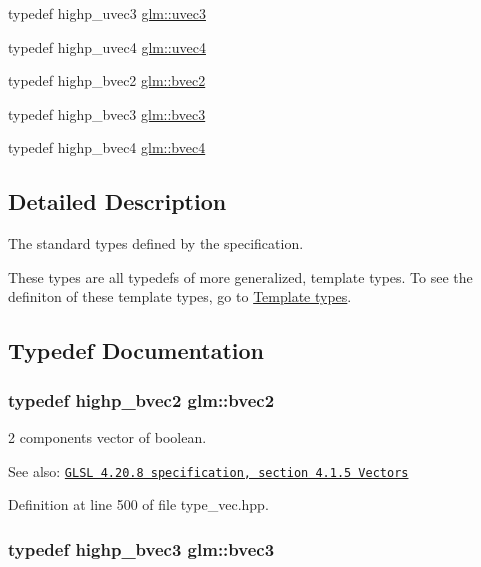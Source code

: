 \begin{CompactItemize}
\item 
typedef highp\_\-uvec3 \hyperlink{group__core__types_gc4ba593917841b859ba1683b8b52b8fa}{glm::uvec3}
\item 
typedef highp\_\-uvec4 \hyperlink{group__core__types_g1c426d19627b32b14f0089f7f4ba7b1d}{glm::uvec4}
\item 
typedef highp\_\-bvec2 \hyperlink{group__core__types_g7523cf292181cf7daef3aa0a3267d8e3}{glm::bvec2}
\item 
typedef highp\_\-bvec3 \hyperlink{group__core__types_g3f07d6d37fc6fe875170fd5799685bcf}{glm::bvec3}
\item 
typedef highp\_\-bvec4 \hyperlink{group__core__types_g6bb211b3d3bebae3867548d5673ca5cd}{glm::bvec4}
\end{CompactItemize}


\subsection{Detailed Description}
The standard types defined by the specification. 

These types are all typedefs of more generalized, template types. To see the definiton of these template types, go to \hyperlink{group__core__template}{Template types}. 

\subsection{Typedef Documentation}
\hypertarget{group__core__types_g7523cf292181cf7daef3aa0a3267d8e3}{
\subsubsection[bvec2]{\setlength{\rightskip}{0pt plus 5cm}typedef highp\_\-bvec2 {\bf glm::bvec2}}}
\label{group__core__types_g7523cf292181cf7daef3aa0a3267d8e3}


2 components vector of boolean.

\begin{Desc}
\item[See also:]\href{http://www.opengl.org/registry/doc/GLSLangSpec.4.20.8.pdf}{\tt GLSL 4.20.8 specification, section 4.1.5 Vectors} \end{Desc}


Definition at line 500 of file type\_\-vec.hpp.\hypertarget{group__core__types_g3f07d6d37fc6fe875170fd5799685bcf}{
\subsubsection[bvec3]{\setlength{\rightskip}{0pt plus 5cm}typedef highp\_\-bvec3 {\bf glm::bvec3}}}
\label{group__core__types_g3f07d6d37fc6fe875170fd5799685bcf}


